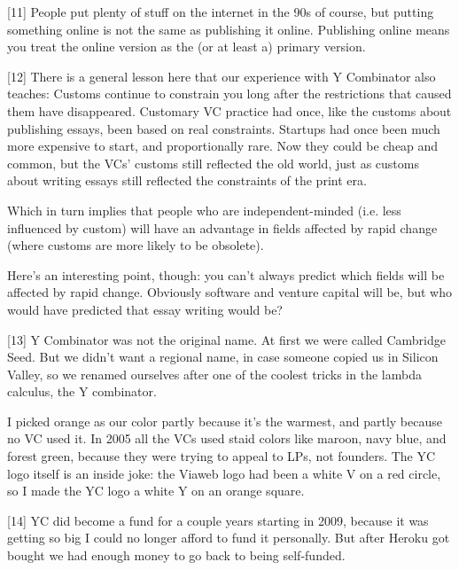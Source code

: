 [11] People put plenty of stuff on the internet in the 90s of
                  course, but putting something online is not the same as
                  publishing it online. Publishing online means you treat the
                  online version as the (or at least a) primary version.

[12] There is a general lesson here that our experience with Y
                  Combinator also teaches: Customs continue to constrain you
                  long after the restrictions that caused them have disappeared.
                  Customary VC practice had once, like the customs about
                  publishing essays, been based on real constraints. Startups
                  had once been much more expensive to start, and proportionally
                  rare. Now they could be cheap and common, but the VCs' customs
                  still reflected the old world, just as customs about writing
                  essays still reflected the constraints of the print era.

Which
                  in turn implies that people who are independent-minded (i.e.
                  less influenced by custom) will have an advantage in fields
                  affected by rapid change (where customs are more likely to be
                  obsolete).

Here's an interesting point, though: you
                  can't always predict which fields will be affected by rapid
                  change. Obviously software and venture capital will be, but
                  who would have predicted that essay writing would be?

[13] Y Combinator was not the original name. At first we were
                  called Cambridge Seed. But we didn't want a regional name, in
                  case someone copied us in Silicon Valley, so we renamed
                  ourselves after one of the coolest tricks in the lambda
                  calculus, the Y combinator.

I picked orange as our
                  color partly because it's the warmest, and partly because no
                  VC used it. In 2005 all the VCs used staid colors like maroon,
                  navy blue, and forest green, because they were trying to
                  appeal to LPs, not founders. The YC logo itself is an inside
                  joke: the Viaweb logo had been a white V on a red circle, so I
                  made the YC logo a white Y on an orange square.

[14] YC did become a fund for a couple years starting in 2009,
                  because it was getting so big I could no longer afford to fund
                  it personally. But after Heroku got bought we had enough money
                  to go back to being self-funded.

